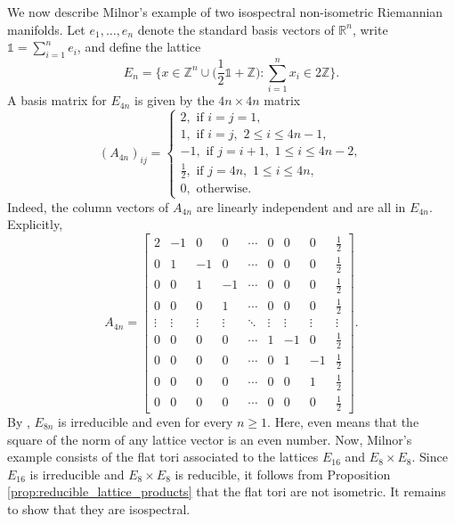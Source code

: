 \documentclass{amsart}
\theoremstyle{definition}
\newcommand*{\R}{\mathbb{R}}
\newcommand*{\Z}{\mathbb{Z}}
\begin{document}
We now describe Milnor's example of two isospectral non-isometric Riemannian manifolds. Let $e_1,\dots,e_n$ denote the standard basis vectors of $\R^n$, write $\mathds{1} = \sum_{i=1}^n e_i$, and define the lattice
\begin{equation*}
    E_n = \biggl\{x \in \Z^n \cup \biggl(\frac{1}{2}\mathds{1} + \Z\biggr) : \sum_{i=1}^n x_i \in 2\Z\biggr\}.
\end{equation*}
A basis matrix for $E_{4n}$ is given by the $4n \times 4n$ matrix
\begin{equation*}
   (A_{4n})_{ij} =
   \begin{cases}
       2, \text{ if } i = j = 1, \\
       1, \text{ if } i = j, \,\,2 \leq i \leq 4n-1, \\
       -1, \text{ if } j = i + 1, \,\,1 \leq i \leq 4n-2, \\
       \frac{1}{2}, \text{ if } j = 4n, \,\,1 \leq i \leq 4n, \\
       0, \text{ otherwise. }
   \end{cases}
\end{equation*}
Indeed, the column vectors of $A_{4n}$ are linearly independent and are all in $E_{4n}$. Explicitly,
\begin{equation*}
    A_{4n} =
    \begin{bmatrix}
    2 & -1 & 0 & 0 & \cdots & 0 & 0 & 0 & \frac{1}{2} \\
    0 & 1 & -1 & 0 & \cdots & 0 & 0 & 0 & \frac{1}{2} \\
    0 & 0 & 1 & -1 & \cdots & 0 & 0 & 0 & \frac{1}{2} \\
    0 & 0 & 0 & 1 & \cdots & 0 & 0 & 0 & \frac{1}{2} \\
    \vdots & \vdots & \vdots & \vdots & \ddots & \vdots & \vdots & \vdots & \vdots \\
    0 & 0 & 0 & 0 & \cdots & 1 & -1 & 0 & \frac{1}{2} \\
    0 & 0 & 0 & 0 & \cdots & 0 & 1 & -1 & \frac{1}{2} \\
    0 & 0 & 0 & 0 & \cdots & 0 & 0 & 1 & \frac{1}{2} \\
    0 & 0 & 0 & 0 & \cdots & 0 & 0 & 0 & \frac{1}{2}
\end{bmatrix}.
\end{equation*}
By \cite{conway2013sphere}, $E_{8n}$ is irreducible and even for every $n \geq 1$. Here, even means that the square of the norm of any lattice vector is an even number. Now, Milnor's example consists of the flat tori associated to the lattices $E_{16}$ and $E_8 \times E_8$. Since $E_{16}$ is irreducible and $E_8 \times E_8$ is reducible, it follows from Proposition \ref{prop:reducible_lattice_products} that the flat tori are not isometric. It remains to show that they are isospectral. %
\end{document}
